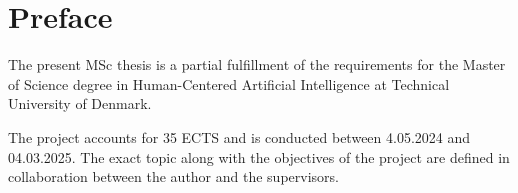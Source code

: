 \chapter{Preface}

The present MSc thesis is a partial fulfillment of the requirements for the Master
of Science degree in Human-Centered Artificial Intelligence at Technical University of Denmark. \newline

\noindent The project accounts for 35 ECTS and is conducted between 4.05.2024 and 04.03.2025. The exact topic along with the objectives of the project are defined in collaboration between the author and the supervisors.

\vfill

